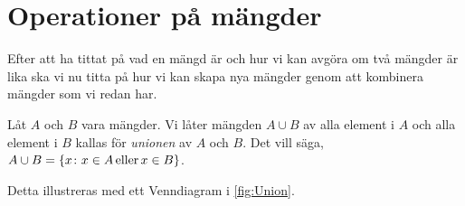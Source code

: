 \section{Operationer på mängder}%
\label{sec:Mangdoperationer}
Efter att ha tittat på vad en mängd är och hur vi kan avgöra om
två mängder är lika ska vi nu titta på hur vi kan skapa nya mängder genom att
kombinera mängder som vi redan har.

\begin{definition}\label{def:Union}
  Låt \(A\) och \(B\) vara mängder.
  Vi låter mängden \(A\cup B\) av alla element i \(A\) och alla element i
  \(B\) kallas för \emph{unionen} av \(A\) och \(B\).
  Det vill säga, \(A\cup B = \{x\colon x\in A\operatorname{eller} x\in B\}\).
\end{definition}
Detta illustreras med ett Venndiagram i \cref{fig:Union}.
